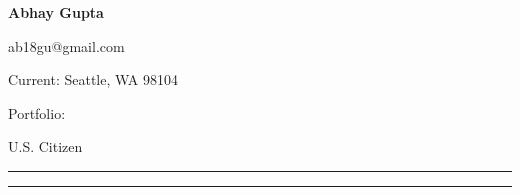 
\hspace{1ex}
{\fontsize{35}{60}\textbf{Abhay Gupta}}

\vspace{-11ex}

\begin{subtitle}
    ab18gu@gmail.com
        \,\SubBulletSymbol\,
            \href{\LinkedIn}{\LinkedIn}
                \,\SubBulletSymbol\,\href{\github}{\github}
    \par{Current: \color{cblue} Seattle, WA 98104}
    \par{Portfolio: \color{pink} \href{\CVWebg}{\CVWeb}{}}
    \par{U.S. Citizen}
\end{subtitle}

\vspace{-3ex}
{\hspace{0.07in}\noindent\color{dblue}\rule{7.1in}{0.4pt}}

\vspace{-3ex}
{\hspace{0.07in}\noindent\color{dblue}\rule{7.1in}{0.4pt}}

